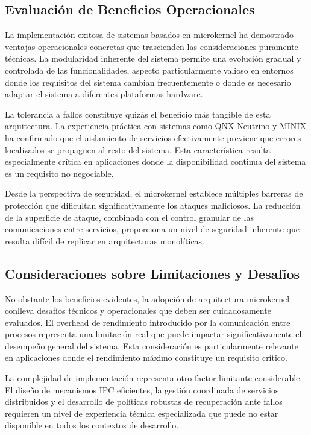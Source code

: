\documentclass[12pt,a4paper]{article}
\begin{document}
\subsection{Evaluación de Beneficios Operacionales}

La implementación exitosa de sistemas basados en microkernel ha demostrado ventajas operacionales concretas que trascienden las consideraciones puramente técnicas. La modularidad inherente del sistema permite una evolución gradual y controlada de las funcionalidades, aspecto particularmente valioso en entornos donde los requisitos del sistema cambian frecuentemente o donde es necesario adaptar el sistema a diferentes plataformas hardware.

La tolerancia a fallos constituye quizás el beneficio más tangible de esta arquitectura. La experiencia práctica con sistemas como QNX Neutrino y MINIX ha confirmado que el aislamiento de servicios efectivamente previene que errores localizados se propaguen al resto del sistema. Esta característica resulta especialmente crítica en aplicaciones donde la disponibilidad continua del sistema es un requisito no negociable.

Desde la perspectiva de seguridad, el microkernel establece múltiples barreras de protección que dificultan significativamente los ataques maliciosos. La reducción de la superficie de ataque, combinada con el control granular de las comunicaciones entre servicios, proporciona un nivel de seguridad inherente que resulta difícil de replicar en arquitecturas monolíticas.

\subsection{Consideraciones sobre Limitaciones y Desafíos}

No obstante los beneficios evidentes, la adopción de arquitectura microkernel conlleva desafíos técnicos y operacionales que deben ser cuidadosamente evaluados. El overhead de rendimiento introducido por la comunicación entre procesos representa una limitación real que puede impactar significativamente el desempeño general del sistema. Esta consideración es particularmente relevante en aplicaciones donde el rendimiento máximo constituye un requisito crítico.

La complejidad de implementación representa otro factor limitante considerable. El diseño de mecanismos IPC eficientes, la gestión coordinada de servicios distribuidos y el desarrollo de políticas robustas de recuperación ante fallos requieren un nivel de experiencia técnica especializada que puede no estar disponible en todos los contextos de desarrollo.
\end{document}
